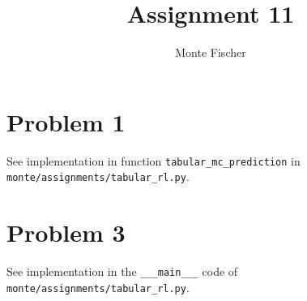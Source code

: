 \documentclass{article}
\title{Assignment 11}
\author{Monte Fischer}
\begin{document}
\maketitle

\section*{Problem 1}

See implementation in function \texttt{tabular\_mc\_prediction} in \texttt{monte/assignments/tabular\_rl.py}.

\section*{Problem 3}

See implementation in the \texttt{\_\_\_main\_\_\_} code of \texttt{monte/assignments/tabular\_rl.py}.
\end{document}
